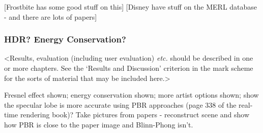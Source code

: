 [Frostbite has some good stuff on this]
[Disney have stuff on the MERL database - and there are lots of papers]

\subsubsection{HDR? Energy Conservation?}

<Results, evaluation (including user evaluation) {\em etc.} should be described in one or more chapters. See the `Results and Discussion' criterion in the mark scheme for the sorts of material that may be included here.>

Fresnel effect shown; energy conservation shown; more artist options shown; show the specular lobe is more accurate using PBR approaches (page 338 of the real-time rendering book)? Take pictures from papers - reconstruct scene and show how PBR is close to the paper image and Blinn-Phong isn't.
